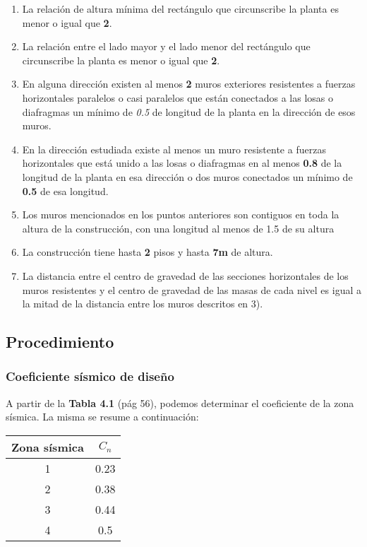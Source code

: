 \documentclass[../main.tex]{subfiles}
\begin{document}
\begin{enumerate}
  \item La relación de altura mínima del rectángulo que circunscribe la planta
    es menor o igual que \textbf{2}.
  \item La relación entre el lado mayor y el lado menor del rectángulo que
    circunscribe la planta es menor o igual que \textbf{2}.
  \item En alguna dirección existen al menos \textbf{2} muros exteriores
    resistentes a fuerzas horizontales paralelos o casi paralelos que están
    conectados a las losas o diafragmas un mínimo de \textit{0.5} de longitud
    de la planta en la dirección de esos muros.
  \item En la dirección estudiada existe al menos un muro resistente a fuerzas
    horizontales que está unido a las losas o diafragmas en al menos \textbf{0.8}
    de la longitud de la planta en esa dirección o dos muros conectados un 
    mínimo de \textbf{0.5} de esa longitud.
  \item Los muros mencionados en los puntos anteriores son contiguos en toda
    la altura de la construcción, con una longitud al menos de 1.5 de su altura
  \item La construcción tiene hasta \textbf{2} pisos y hasta \textbf{7m} de altura.
  \item La distancia entre el centro de gravedad de las secciones horizontales
    de los muros resistentes y el centro de gravedad de las masas de cada
    nivel es igual a la mitad de la distancia entre los muros descritos en 3).
\end{enumerate}

\subsection{Procedimiento}

\subsubsection{Coeficiente sísmico de diseño}

A partir de la \textbf{Tabla 4.1} (pág 56), podemos determinar el coeficiente
de la zona sísmica. La misma se resume a continuación:

\begin{center}
  \begin{tabular}{|c|c|}
    \hline
    \textbf{Zona sísmica} & $C_n$ \\
    \hline
    1 & 0.23 \\
    \hline
    2 & 0.38 \\
    \hline
    3 & 0.44 \\
    \hline
    4 & 0.5 \\
    \hline
 \end{tabular} 
\end{center}
\end{document}

